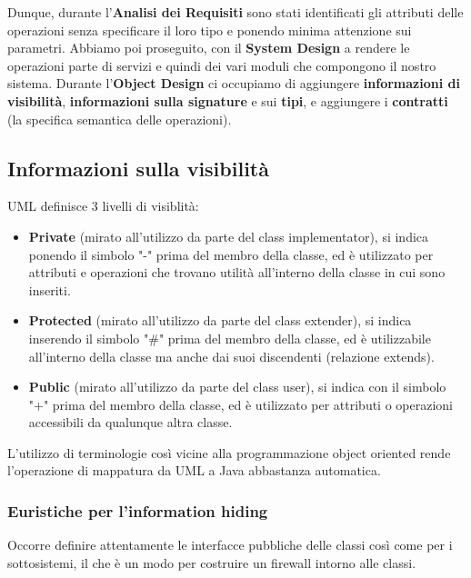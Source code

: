        Dunque, durante l'\textbf{Analisi dei Requisiti} sono stati identificati gli attributi delle operazioni senza specificare il loro tipo e ponendo minima attenzione sui parametri. Abbiamo poi proseguito, con il \textbf{System Design} a rendere le operazioni parte di servizi e quindi dei vari moduli che compongono il nostro sistema. Durante l'\textbf{Object Design} ci occupiamo di aggiungere \textbf{informazioni di visibilità}, \textbf{informazioni sulla signature} e sui \textbf{tipi}, e aggiungere i \textbf{contratti} (la specifica semantica delle operazioni).
        
        \subsection{Informazioni sulla visibilità}
            UML definisce 3 livelli di visiblità:
            \begin{itemize}
                \item \textbf{Private} (mirato all'utilizzo da parte del class implementator), si indica ponendo il simbolo "-" prima del membro della classe, ed è utilizzato per attributi e operazioni che trovano utilità all'interno della classe in cui sono inseriti.
                \item \textbf{Protected} (mirato all'utilizzo da parte del class extender), si indica inserendo il simbolo "\#" prima del membro della classe, ed è utilizzabile all'interno della classe ma anche dai suoi discendenti (relazione extends).
                \item \textbf{Public} (mirato all'utilizzo da parte del class user), si indica con il simbolo "+" prima del membro della classe, ed è utilizzato per attributi o operazioni accessibili da qualunque altra classe.
            \end{itemize}
            
            L'utilizzo di terminologie così vicine alla programmazione object oriented rende l'operazione di mappatura da UML a Java abbastanza automatica.
            
            \subsubsection{Euristiche per l'information hiding} Occorre definire attentamente le interfacce pubbliche delle classi così come per i sottosistemi, il che è un modo per costruire un firewall intorno alle classi.
            
